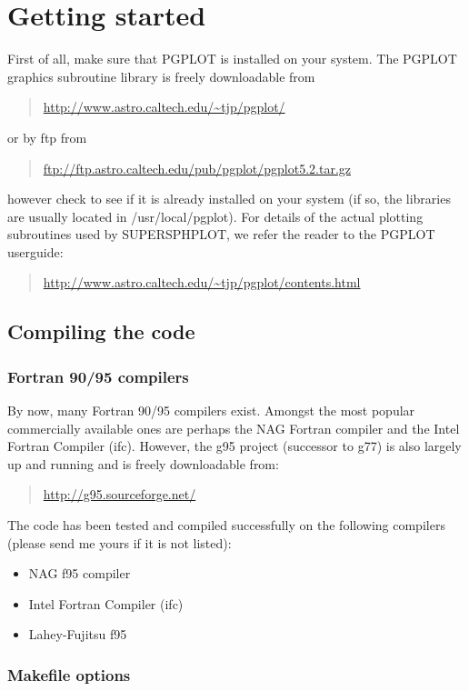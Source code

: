 \documentclass[a4paper,12pt]{article}
\begin{document}
\section{Getting started}
 First of all, make sure that PGPLOT is installed on your system. The PGPLOT
graphics subroutine library is freely downloadable from
\begin{quote}
\url{http://www.astro.caltech.edu/~tjp/pgplot/}
\end{quote}
or by ftp from
\begin{quote}
\url{ftp://ftp.astro.caltech.edu/pub/pgplot/pgplot5.2.tar.gz}
\end{quote}
however check to see if it is already installed on your system (if so, the libraries are
usually located in /usr/local/pgplot). For details of the actual plotting subroutines
used by SUPERSPHPLOT, we refer the reader to the PGPLOT userguide:
\begin{quote}
\url{http://www.astro.caltech.edu/~tjp/pgplot/contents.html}
\end{quote}

\subsection{Compiling the code}

\subsubsection{Fortran 90/95 compilers}
 By now, many Fortran 90/95 compilers exist. Amongst the most popular commercially
available ones are perhaps the NAG Fortran compiler and the Intel Fortran Compiler (ifc). However, the
g95 project (successor to g77) is also largely up and running and is freely
downloadable from:
\begin{quote}
\url{http://g95.sourceforge.net/}
\end{quote}

 The code has been tested and compiled successfully on the following compilers
(please send me yours if it is not listed):
\begin{itemize}
\item NAG f95 compiler
\item Intel Fortran Compiler (ifc)
\item Lahey-Fujitsu f95
\end{itemize}

\subsubsection{Makefile options}
\end{document}
